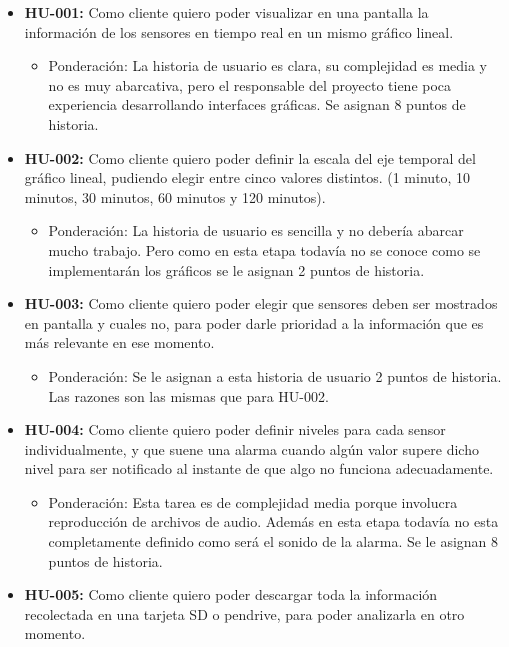 \documentclass[11pt]{charter}
\begin{document}
\begin{itemize}
\item \textbf{HU-001:} Como cliente quiero poder visualizar en una pantalla la información de los sensores en tiempo real en un mismo gráfico lineal.
	\begin{itemize}
	\item Ponderación: La historia de usuario es clara, su complejidad es media y no es muy abarcativa, pero el responsable del proyecto tiene poca experiencia desarrollando interfaces gráficas. Se asignan 8 puntos de historia.
	\end{itemize}
\item \textbf{HU-002:} Como cliente quiero poder definir la escala del eje temporal del gráfico lineal, pudiendo elegir entre cinco valores distintos. (1 minuto, 10 minutos, 30 minutos, 60 minutos y 120 minutos).
	\begin{itemize}
	\item Ponderación: La historia de usuario es sencilla y no debería abarcar mucho trabajo. Pero como en esta etapa todavía no se conoce como se implementarán los gráficos se le asignan 2 puntos de historia.
	\end{itemize}
\item \textbf{HU-003:} Como cliente quiero poder elegir que sensores deben ser mostrados en pantalla y cuales no, para poder darle prioridad a la información que es más relevante en ese momento.
	\begin{itemize}
	\item Ponderación: Se le asignan a esta historia de usuario 2 puntos de historia. Las razones son las mismas que para HU-002.
	\end{itemize}
\item \textbf{HU-004:} Como cliente quiero poder definir niveles para cada sensor individualmente, y que suene una alarma cuando algún valor supere dicho nivel para ser notificado al instante de que algo no funciona adecuadamente.
	\begin{itemize}
	\item Ponderación: Esta tarea es de complejidad media porque involucra reproducción de archivos de audio. Además en esta etapa todavía no esta completamente definido como será el sonido de la alarma. Se le asignan 8 puntos de historia.
	\end{itemize}
\item \textbf{HU-005:} Como cliente quiero poder descargar toda la información recolectada en una tarjeta SD o pendrive, para poder analizarla en otro momento.

\end{itemize}
\end{document}
